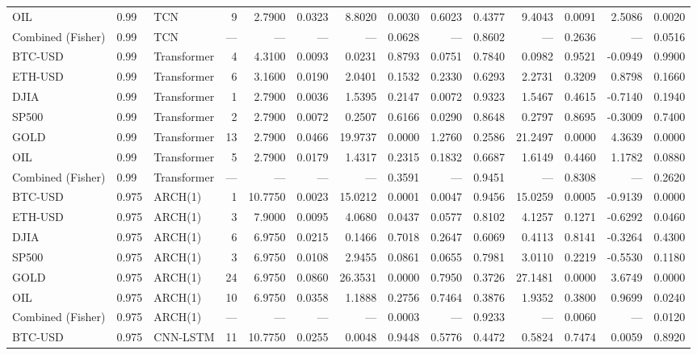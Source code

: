 \begin{table}[ht]
\begin{tabular}{lllrrrrrrrrrrr}
OIL & 0.99 & TCN & 9 & 2.7900 & 0.0323 & 8.8020 & 0.0030 & 0.6023 & 0.4377 & 9.4043 & 0.0091 & 2.5086 & 0.0020 \\
Combined (Fisher) & 0.99 & TCN & — & — & — & — & 0.0628 & — & 0.8602 & — & 0.2636 & — & 0.0516 \\
BTC-USD & 0.99 & Transformer & 4 & 4.3100 & 0.0093 & 0.0231 & 0.8793 & 0.0751 & 0.7840 & 0.0982 & 0.9521 & -0.0949 & 0.9900 \\
ETH-USD & 0.99 & Transformer & 6 & 3.1600 & 0.0190 & 2.0401 & 0.1532 & 0.2330 & 0.6293 & 2.2731 & 0.3209 & 0.8798 & 0.1660 \\
DJIA & 0.99 & Transformer & 1 & 2.7900 & 0.0036 & 1.5395 & 0.2147 & 0.0072 & 0.9323 & 1.5467 & 0.4615 & -0.7140 & 0.1940 \\
SP500 & 0.99 & Transformer & 2 & 2.7900 & 0.0072 & 0.2507 & 0.6166 & 0.0290 & 0.8648 & 0.2797 & 0.8695 & -0.3009 & 0.7400 \\
GOLD & 0.99 & Transformer & 13 & 2.7900 & 0.0466 & 19.9737 & 0.0000 & 1.2760 & 0.2586 & 21.2497 & 0.0000 & 4.3639 & 0.0000 \\
OIL & 0.99 & Transformer & 5 & 2.7900 & 0.0179 & 1.4317 & 0.2315 & 0.1832 & 0.6687 & 1.6149 & 0.4460 & 1.1782 & 0.0880 \\
Combined (Fisher) & 0.99 & Transformer & — & — & — & — & 0.3591 & — & 0.9451 & — & 0.8308 & — & 0.2620 \\
BTC-USD & 0.975 & ARCH(1) & 1 & 10.7750 & 0.0023 & 15.0212 & 0.0001 & 0.0047 & 0.9456 & 15.0259 & 0.0005 & -0.9139 & 0.0000 \\
ETH-USD & 0.975 & ARCH(1) & 3 & 7.9000 & 0.0095 & 4.0680 & 0.0437 & 0.0577 & 0.8102 & 4.1257 & 0.1271 & -0.6292 & 0.0460 \\
DJIA & 0.975 & ARCH(1) & 6 & 6.9750 & 0.0215 & 0.1466 & 0.7018 & 0.2647 & 0.6069 & 0.4113 & 0.8141 & -0.3264 & 0.4300 \\
SP500 & 0.975 & ARCH(1) & 3 & 6.9750 & 0.0108 & 2.9455 & 0.0861 & 0.0655 & 0.7981 & 3.0110 & 0.2219 & -0.5530 & 0.1180 \\
GOLD & 0.975 & ARCH(1) & 24 & 6.9750 & 0.0860 & 26.3531 & 0.0000 & 0.7950 & 0.3726 & 27.1481 & 0.0000 & 3.6749 & 0.0000 \\
OIL & 0.975 & ARCH(1) & 10 & 6.9750 & 0.0358 & 1.1888 & 0.2756 & 0.7464 & 0.3876 & 1.9352 & 0.3800 & 0.9699 & 0.0240 \\
Combined (Fisher) & 0.975 & ARCH(1) & — & — & — & — & 0.0003 & — & 0.9233 & — & 0.0060 & — & 0.0120 \\
BTC-USD & 0.975 & CNN-LSTM & 11 & 10.7750 & 0.0255 & 0.0048 & 0.9448 & 0.5776 & 0.4472 & 0.5824 & 0.7474 & 0.0059 & 0.8920 \\

\end{tabular}
\end{table}
